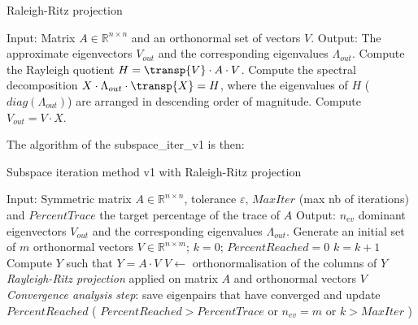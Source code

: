 \begin{algorithm}[H]
    \begin{algorithmic}
    \caption{\label{alg:rrp} Raleigh-Ritz projection}
      \STATE Input: Matrix $A \in \mathbb{R}^{n \times n}$ and an orthonormal set of vectors $V$.
      \STATE Output: The approximate eigenvectors $V_{out}$ and the corresponding
      eigenvalues $\Lambda_{out}$.
      \STATE Compute the Rayleigh quotient $H=\transp{V} \cdot A \cdot V$.
      \STATE Compute the spectral decomposition $X \cdot \Lambda_{out} \cdot \transp{X} = H$,
      where the eigenvalues of $H$ ($diag(\Lambda_{out})$) are arranged in descending order of magnitude.
      \STATE Compute $V_{out}=V \cdot X$. 
    \end{algorithmic}
    \end{algorithm}
    
    The algorithm of the subspace\_iter\_v1 is then:
    
    \begin{algorithm}[H]
    \begin{algorithmic}
    \caption{\label{alg:sub2} Subspace iteration method v1 with Raleigh-Ritz projection}
    \STATE Input: Symmetric matrix \(A \in \mathbb{R}^{n \times n}\),  tolerance $\varepsilon $, $MaxIter$ (max nb of iterations) and $PercentTrace$ the target percentage of the trace of $A$
    \STATE Output: $n_{ev}$ dominant  eigenvectors $V_{out}$ and the corresponding eigenvalues $\Lambda_{out}$.
    \STATE
    \STATE Generate an initial set of $m$ orthonormal vectors $V \in
      \mathbb{R}^{n\times m}$; $k = 0$; $PercentReached=0$
    \REPEAT
    \STATE $k = k+1$
    \STATE Compute $Y$ such that \( Y = A \cdot V \) 
    \STATE $V \longleftarrow$ orthonormalisation of the columns of $Y$
    \STATE \emph{Rayleigh-Ritz projection} applied on matrix $A$ and orthonormal vectors $V$ 
    \STATE \emph{Convergence analysis step}: save eigenpairs that have converged and update $PercentReached$
    \UNTIL  ( $PercentReached>PercentTrace$ or  $n_{ev} = m$ or $k > MaxIter$ )
    \end{algorithmic}
    \end{algorithm}